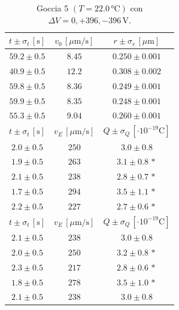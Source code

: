 \documentclass[]{article}
\begin{document}
    \begin{table}[H]
        \centering
        \begin{tabular}{||c|c|c||}
            \hline
            $t \pm \sigma_t \, \left[\text{s}\right]$ & $v_0 \, \left[\mu\text{m/s}\right]$ & $r \pm \sigma_r \, \left[\mu\text{m}\right]$ \\\hline
            \hline
            $59.2 \pm 0.5$ & $8.45$ & $0.250 \pm 0.001$ \\\hline
            $40.9 \pm 0.5$ & $12.2$ & $0.308 \pm 0.002$ \\\hline
            $59.8 \pm 0.5$ & $8.36$ & $0.249 \pm 0.001$ \\\hline
            $59.9 \pm 0.5$ & $8.35$ & $0.248 \pm 0.001$ \\\hline
            $55.3 \pm 0.5$ & $9.04$ & $0.260 \pm 0.001$ \\\hline
            \hline
            $t \pm \sigma_t \, \left[\text{s}\right]$ & $v_E \, \left[\mu\text{m/s}\right]$ & $Q \pm \sigma_Q \, \left[\cdot 10^{-19} \text{C}\right]$ \\\hline
            \hline
            $2.0 \pm 0.5$ & $250$ & $3.0 \pm 0.8$ \\\hline
            $1.9 \pm 0.5$ & $263$ & $3.1 \pm 0.8\,\ast$ \\\hline
            $2.1 \pm 0.5$ & $238$ & $2.8 \pm 0.7\,\ast$ \\\hline
            $1.7 \pm 0.5$ & $294$ & $3.5 \pm 1.1\,\ast$ \\\hline
            $2.2 \pm 0.5$ & $227$ & $2.7 \pm 0.6\,\ast$ \\\hline
            \hline
            $t \pm \sigma_t \, \left[\text{s}\right]$ & $v_E \, \left[\mu\text{m/s}\right]$ & $Q \pm \sigma_Q \, \left[\cdot 10^{-19} \text{C}\right]$ \\\hline
            \hline
            $2.1 \pm 0.5$ & $238$ & $3.0 \pm 0.8$ \\\hline
            $2.0 \pm 0.5$ & $250$ & $3.2 \pm 0.8\,\ast$ \\\hline
            $2.3 \pm 0.5$ & $217$ & $2.8 \pm 0.6\,\ast$ \\\hline
            $1.8 \pm 0.5$ & $278$ & $3.5 \pm 1.0\,\ast$ \\\hline
            $2.1 \pm 0.5$ & $238$ & $3.0 \pm 0.8$ \\\hline
        \end{tabular}
        \caption{Goccia 5 $\left(T = 22.0\, \text{°C}\right)$ con $\Delta V = 0,+396,-396 \,\text{V}$.}
        \label{goccia-5}
    \end{table}
\end{document}
